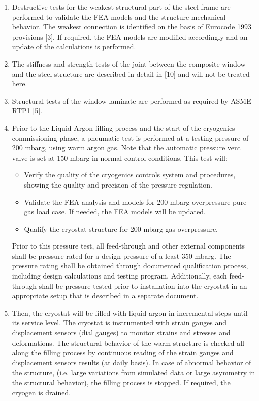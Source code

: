 \begin{enumerate}
    \item Destructive tests for the weakest structural part of the steel frame are performed to validate the FEA models and the structure mechanical behavior. The weakest connection is identified on the basis of Eurocode 1993 provisions [3]. If required, the FEA models are modified accordingly and an update of the calculations is performed. 
    \item The stiffness and strength tests of the joint between the composite window and the steel structure are described in detail in [10] and will not be treated here.
    \item Structural tests of the window laminate are performed as required by ASME RTP1 [5].
    \item Prior to the Liquid Argon filling process and the start of the cryogenics commissioning phase, a pneumatic test is performed at a testing pressure of 200 mbarg, using warm argon gas. Note that the automatic pressure vent valve is set at 150 mbarg in normal control conditions. This test will: 
    \begin{itemize}
    \item Verify the quality of the cryogenics controls system and procedures, showing the quality and precision of the pressure regulation. 
    \item Validate the FEA analysis and models for 200 mbarg overpressure pure gas load case. If needed, the FEA models will be updated.
    \item Qualify the cryostat structure for 200 mbarg gas overpressure. 
    \end{itemize}

Prior to this pressure test, all feed-through and other external components shall be pressure rated for a design pressure of a least 350 mbarg. The pressure rating shall be obtained through documented qualification process, including design calculations and testing program. Additionally, each feed-through shall be pressure tested prior to installation into the cryostat in an appropriate setup that is described in a separate document. 

    \item Then, the cryostat will be filled with liquid argon in incremental steps until its service level. The cryostat is instrumented with strain gauges and displacement sensors (dial gauges) to monitor strains and stresses and deformations. The structural behavior of the warm structure is checked all along the filling process by continuous reading of the strain gauges and displacement sensors results (at daily basis). In case of abnormal behavior of the structure, (i.e. large variations from simulated data or large asymmetry in the structural behavior), the filling process is stopped. If required, the cryogen is drained.


\end{enumerate}
